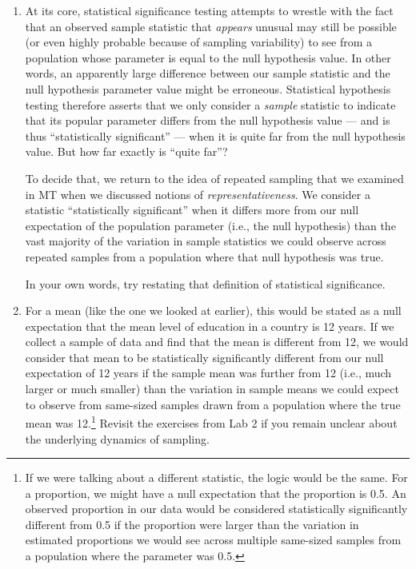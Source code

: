 \documentclass[a4paper,12pt]{article}
\begin{document}
\begin{enumerate}
\item At its core, statistical significance testing attempts to wrestle with the fact that an observed sample statistic that \textit{appears} unusual may still be possible (or even highly probable because of sampling variability) to see from a population whose parameter is equal to the null hypothesis value. In other words, an apparently large difference between our sample statistic and the null hypothesis parameter value might be erroneous. Statistical hypothesis testing therefore asserts that we only consider a \textit{sample} statistic to indicate that its popular parameter differs from the null hypothesis value --- and is thus ``statistically significant'' --- when it is quite far from the null hypothesis value. But how far exactly is ``quite far''?

To decide that, we return to the idea of repeated sampling that we examined in MT when we discussed notions of \textit{representativeness}. We consider a statistic ``statistically significant'' when it differs more from our null expectation of the population parameter (i.e., the null hypothesis) than the vast majority of the variation in sample statistics we could observe across repeated samples from a population where that null hypothesis was true.

In your own words, try restating that definition of statistical significance.

\vspace{6em}




\item For a mean (like the one we looked at earlier), this would be stated as a null expectation that the mean level of education in a country is 12 years. If we collect a sample of data and find that the mean is different from 12, we would consider that mean to be statistically significantly different from our null expectation of 12 years if the sample mean was further from 12 (i.e., much larger or much smaller) than the variation in sample means we could expect to observe from same-sized samples drawn from a population where the true mean was 12.\footnote{If we were talking about a different statistic, the logic would be the same. For a proportion, we might have a null expectation that the proportion is 0.5. An observed proportion in our data would be considered statistically significantly different from 0.5 if the proportion were larger than the variation in estimated proportions we would see across multiple same-sized samples from a population where the parameter was 0.5.} Revisit the exercises from Lab 2 if you remain unclear about the underlying dynamics of sampling.


\end{enumerate}
\end{document}
